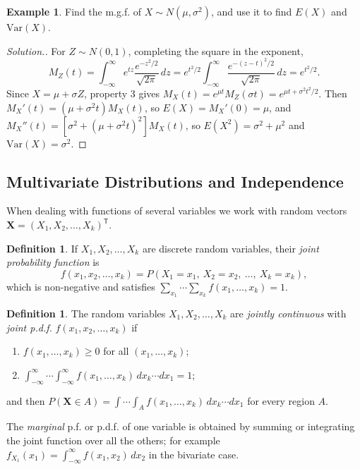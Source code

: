 \documentclass[12pt,a4paper]{report}
\theoremstyle{definition}
\newtheorem{definition}[thm]{Definition}
\newtheorem{example}[thm]{Example}
\theoremstyle{plain}
\newenvironment{solution}
  {\renewcommand{\qedsymbol}{}\begin{proof}[\textit{Solution}.]}
  {\end{proof}}
\begin{document}
\begin{example}
\label{ex:mgfnormal}
Find the m.g.f. of $X\sim N(\mu,\sigma^2)$, and use it to find $E(X)$ and
$\text{Var}(X)$.
\end{example}

\begin{solution}
For $Z\sim N(0,1)$, completing the square in the exponent,
\[M_Z(t) = \int_{-\infty}^\infty e^{tz}\frac{e^{-z^2/2}}{\sqrt{2\pi}}\,dz =
e^{t^2/2}\int_{-\infty}^\infty\frac{e^{-(z - t)^2/2}}{\sqrt{2\pi}}\,dz =
e^{t^2/2} .\]
Since $X = \mu + \sigma Z$, property 3 gives
$M_X(t) = e^{\mu t}M_Z(\sigma t) = e^{\mu t + \sigma^2t^2/2}$. Then
$M_X'(t) = (\mu + \sigma^2t)M_X(t)$, so $E(X) = M_X'(0) = \mu$, and
$M_X''(t) = \left[\sigma^2 + (\mu + \sigma^2t)^2\right]M_X(t)$, so
$E(X^2) = \sigma^2 + \mu^2$ and $\text{Var}(X) = \sigma^2$.
\end{solution}

\subsection{Multivariate Distributions and Independence}

When dealing with functions of several variables we work with random vectors
$\mathbf{X} = (X_1, X_2, \dots, X_k)^{\mathsf T}$.

\begin{definition}
\label{def:jointdiscrete}
If $X_1,X_2,\dots,X_k$ are discrete random variables, their \emph{joint
probability function} is
\[f(x_1,x_2,\dots,x_k) = P(X_1=x_1,\ X_2=x_2,\ \dots,\ X_k=x_k),\]
which is non-negative and satisfies
$\sum_{x_1}\cdots\sum_{x_k} f(x_1,\dots, x_k) = 1$.
\end{definition}

\begin{definition}
\label{def:jointcontinuous}
The random variables $X_1,X_2,\dots,X_k$ are \emph{jointly continuous} with
\emph{joint p.d.f.} $f(x_1,x_2,\dots,x_k)$ if
\begin{enumerate}
\item $f(x_1,\dots,x_k)\geq 0$ for all $(x_1, \dots, x_k)$;
\item $\int_{-\infty}^\infty\cdots\int_{-\infty}^\infty f(x_1,\dots,x_k)\,dx_k
\cdots dx_1 = 1$;
\end{enumerate}
and then $P(\mathbf X\in A) = \int\cdots\int_A f(x_1,\dots,x_k)\,dx_k\cdots dx_1$
for every region $A$.
\end{definition}

The \emph{marginal} p.f. or p.d.f. of one variable is obtained by summing or
integrating the joint function over all the others; for example
$f_{X_1}(x_1) = \int_{-\infty}^\infty f(x_1,x_2)\,dx_2$ in the bivariate case.
\end{document}

